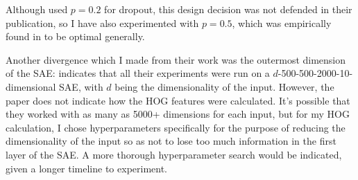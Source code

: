 Although \cite{xie2016unsupervised} used $p=0.2$ for dropout, this design decision was not defended in their publication, so I have also experimented with $p=0.5$, which was empirically found in \cite{srivastava2014dropout} to be optimal generally.

Another divergence which I made from their work was the outermost dimension of the SAE: \cite{xie2016unsupervised} indicates that all their experiments were run on a $d$-500-500-2000-10-dimensional SAE, with $d$ being the dimensionality of the input. However, the paper does not indicate how the HOG features were calculated. It's possible that they worked with as many as 5000+ dimensions for each input, but for my HOG calculation, I chose hyperparameters specifically for the purpose of reducing the dimensionality of the input so as not to lose too much information in the first layer of the SAE. A more thorough hyperparameter search would be indicated, given a longer timeline to experiment.

